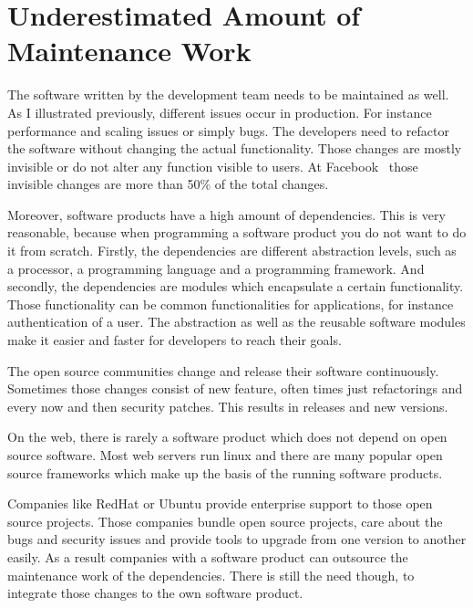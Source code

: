 \section{Underestimated Amount of Maintenance Work}

The software written by the development team needs to be maintained as well. As I
illustrated previously, different issues occur in production. For instance performance and
scaling issues or simply bugs. The developers need to refactor the software without
changing the actual functionality. Those changes are mostly invisible or do not alter any
function visible to users. At Facebook~\cite{dev_at_fb} those invisible changes are more
than 50\% of the total changes.

Moreover, software products have a high amount of dependencies. This is very reasonable,
because when programming a software product you do not want to do it from
scratch. Firstly, the dependencies are different abstraction levels, such as a processor,
a programming language and a programming framework. And secondly, the dependencies are
modules which encapsulate a certain functionality. Those functionality can be common
functionalities for applications, for instance authentication of a user. The abstraction
as well as the reusable software modules make it easier and faster for developers to reach
their goals.

The open source communities change and release their software continuously. Sometimes
those changes consist of new feature, often times just refactorings and every now and then
security patches. This results in releases and new versions.

On the web, there is rarely a software product which does not depend on open source
software. Most web servers run linux and there are many popular open source frameworks
which make up the basis of the running software products.

Companies like RedHat or Ubuntu provide enterprise support to those open source
projects. Those companies bundle open source projects, care about the bugs and
security issues and provide tools to upgrade from one version to another easily. As a
result companies with a software product can outsource the maintenance work of the
dependencies. There is still the need though, to integrate those changes to the own
software product.

